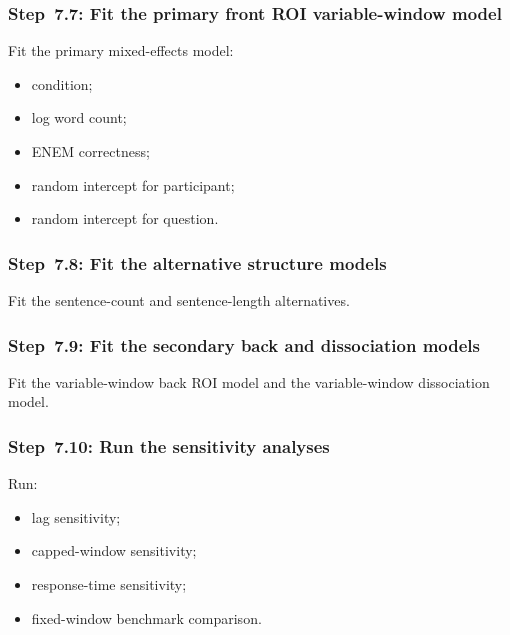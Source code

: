 \subsubsection{Step~7.7: Fit the primary front ROI variable-window model}
Fit the primary mixed-effects model:
\begin{itemize}
    \item condition;
    \item log word count;
    \item ENEM correctness;
    \item random intercept for participant;
    \item random intercept for question.
\end{itemize}

\subsubsection{Step~7.8: Fit the alternative structure models}
Fit the sentence-count and sentence-length alternatives.

\subsubsection{Step~7.9: Fit the secondary back and dissociation models}
Fit the variable-window back ROI model and the variable-window dissociation model.

\subsubsection{Step~7.10: Run the sensitivity analyses}
Run:
\begin{itemize}
    \item lag sensitivity;
    \item capped-window sensitivity;
    \item response-time sensitivity;
    \item fixed-window benchmark comparison.
\end{itemize}

